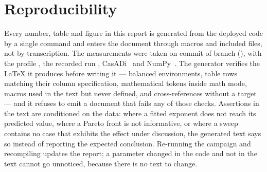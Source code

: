 \documentclass[11pt,a4paper]{article}
\begin{document}
\section*{Reproducibility}

Every number, table and figure in this report is generated from the deployed code by a single command and
enters the document through macros and included files, not by transcription. The measurements were taken on
commit \texttt{\resCommit} of branch \texttt{\resBranch} (\resDate), with the profile \resProfile{}, the
recorded run \resBag, CasADi~\resCasadi{} and NumPy~\resNumpy. The generator verifies the LaTeX it produces
before writing it --- balanced environments, table rows matching their column specification, mathematical
tokens inside math mode, macros used in the text but never defined, and cross-references without a target ---
and it refuses to emit a document that fails any of those checks. Assertions in the text are conditioned on
the data: where a fitted exponent does not reach its predicted value, where a Pareto front is not
informative, or where a sweep contains no case that exhibits the effect under discussion, the generated text
says so instead of reporting the expected conclusion. Re-running the campaign and recompiling updates the
report; a parameter changed in the code and not in the text cannot go unnoticed, because there is no text to
change.


\end{document}
